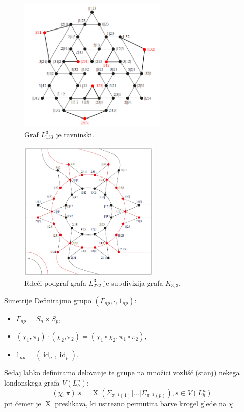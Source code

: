 \documentclass[dvipsnames]{beamer}
\DeclareMathOperator {\id} {id}
\DeclareMathOperator {\X}{X}
\begin{document}
\begin{frame}
    \begin{figure}[h]
        \includegraphics[width=200pt]{../img/graph-L^3_133.png}
        \caption{Graf $L^3_{133}$ je ravninski.}
        \label{fig:L^3_133}
    \end{figure}
\end{frame}

\begin{frame}
    \begin{figure}[h]
        \includegraphics[width=190pt]{../img/tolgraph-O^3_222-subdivision.png}
        \caption{Rdeči podgraf grafa $L_{222}^3$ je subdivizija grafa $K_{3,3}$.}
    \end{figure}
\end{frame}

\begin{frame}{Simetrije}
    Definirajmo grupo $(\Gamma_{np}, \cdot, 1_{np})$:
    \begin{itemize}
        \item $\Gamma_{np} = S_n \times S_p$,
        \item $(\chi_1,\pi_1) \cdot (\chi_2,\pi_2) = (\chi_1 \circ \chi_2,\pi_1 \circ \pi_2), $
        \item  $1_{np} = (\id_n, \id_p).$
    \end{itemize}
    \medskip
    Sedaj lahko definiramo delovanje te grupe na množici vozlišč (stanj) nekega londonskega grafa $V(L_h^n)$:
    \[ (\chi,\pi) . s = \X \left( \Sigma_{\pi^{-1}(1)} | \ldots | \Sigma_{\pi^{-1}(p)} \right), s \in V(L_h^n) \]
    pri čemer je $\X$ preslikava, ki ustrezno permutira barve krogel glede na $\chi$.
\end{frame}
\end{document}
